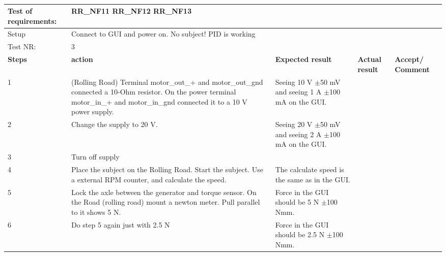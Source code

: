 \begin{table}[h!]
	\centering
	\label{my-label}	
	\begin{tabular}{|p{1.5 cm}|p{4.2 cm}|p{2.1 cm}|p{2.1 cm}|p{2.1 cm}|}
		\hline
		Test of requirements: 
		& \multicolumn{4}{l|}{RR\_NF11 RR\_NF12 RR\_NF13} \\ \hline
		Setup 
		& \multicolumn{4}{l|}{Connect to GUI and power on. No subject! PID is working} \\ \hline
		Test NR:
		& \multicolumn{4}{l|}{3} \\ \hline
		\textbf{Steps} & \textbf{action} & \textbf{Expected result} & 
		\textbf{Actual result} & \textbf{Accept/ Comment} \\ \hline
		1 
		& (Rolling Road) Terminal motor\_out\_+ and motor\_out\_gnd connected a 10-Ohm resistor. On the power terminal motor\_in\_+ and motor\_in\_gnd connected it to a 10 V power supply.  
		& Seeing 10 V $\pm$50 mV and seeing 1 A $\pm$100 mA on the GUI. 
		&
		& \\ \hline
		2
		& Change the supply to 20 V.
		& Seeing 20 V $\pm$50 mV and seeing 2 A $\pm$100 mA on the GUI.
		&
		& \\ \hline
		3
		& Turn off supply
		& 
		&
		& \\ \hline
		4
		& Place the subject on the Rolling Road. Start the subject. Use a external RPM counter, and calculate the speed. 
		& The calculate speed is the same as in the GUI.
		&
		& \\ \hline
		5
		& Lock the axle between the generator and torque sensor. On the Road (rolling road) mount a newton meter. Pull parallel to it shows 5 N.  
		& Force in the GUI should be 5 N $\pm$100 Nmm.
		&
		& \\ \hline
		6
		& Do step 5 again just with 2.5 N 
		& Force in the GUI should be 2.5 N $\pm$100 Nmm.
		&
		& \\ \hline
	\end{tabular}
	\caption{}
\end{table}


